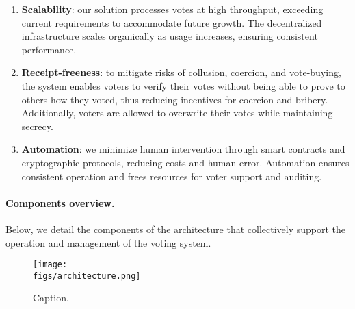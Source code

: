 \begin{enumerate}
	\item \textbf{Scalability}: our solution processes votes at high throughput, exceeding current requirements to accommodate future growth. The decentralized infrastructure scales organically as usage increases, ensuring consistent performance.
	
	\item \textbf{Receipt-freeness}: to mitigate risks of collusion, coercion, and vote-buying, the system enables voters to verify their votes without being able to prove to others how they voted, thus reducing incentives for coercion and bribery. Additionally, voters are allowed to overwrite their votes while maintaining secrecy.
	
	\item \textbf{Automation}: we minimize human intervention through smart contracts and cryptographic protocols, reducing costs and human error. Automation ensures consistent operation and frees resources for voter support and auditing.
\end{enumerate}

\paragraph{Components overview.}

Below, we detail the components of the architecture that collectively support the operation and management of the voting system.

\begin{figure}[h]
	\centerline{\texttt{[image: \\figs/architecture.png]}}
	\caption{Caption.}
	\label{fig:circuit-inputs}
\end{figure}

